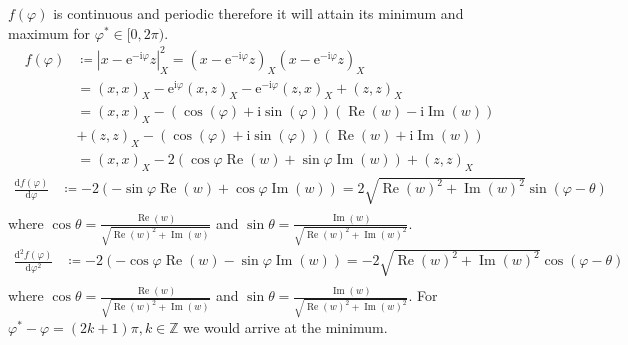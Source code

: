 		\begin{Proof}
			$f(\varphi)$ is continuous and periodic therefore it will attain its minimum and maximum for $\varphi^\ast \in [0,2\pi)$\cite{Rudin1976}\cite{Rudin1987}.
			\begin{equation*}
				\begin{split}
				f(\varphi) &\coloneqq \left|x-\mathrm{e}^{-\mathrm{i}\varphi}z\right|^2_X = 
				\left(x-\mathrm{e}^{-\mathrm{i}\varphi}z\right)_X\left(x-\mathrm{e}^{-\mathrm{i}\varphi}z\right)_X\\
						   &= \left(x,x\right)_X - \mathrm{e}^{\mathrm{i}\varphi}\left(x,z\right)_X-\mathrm{e}^{-\mathrm{i}\varphi}\left(z,x\right)_X+\left(z,z\right)_X \\
                		   &= \left(x,x\right)_X - (\cos(\varphi)+\mathrm{i}\sin(\varphi))\left(\operatorname{Re}(w) -\mathrm{i}\operatorname{Im}(w)\right)\\
						   &+ \left(z,z\right)_X - (\cos(\varphi)+\mathrm{i}\sin(\varphi))\left(\operatorname{Re}(w) +\mathrm{i}\operatorname{Im}(w)\right)\\
						   &= \left(x,x\right)_X - 2\left(\cos\varphi\operatorname{Re}(w)+\sin\varphi\operatorname{Im}(w)\right)+ \left(z,z\right)_X
				\end{split}
			  \end{equation*}
			  \begin{equation*}
				\begin{split}
				\frac{\mathrm{d}f(\varphi)}{\mathrm{d}\varphi} &\coloneqq - 2\left(-\sin\varphi\operatorname{Re}(w)+\cos\varphi\operatorname{Im}(w)\right) = 2\sqrt{\operatorname{Re}(w)^2+\operatorname{Im}(w)^2}\sin(\varphi-\theta)\\ 
				\end{split}
			  \end{equation*}
			  where $\cos\theta = \frac{\operatorname{Re}(w)}{\sqrt{\operatorname{Re}(w)^2+\operatorname{Im}(w)}}$ and $\sin\theta = \frac{\operatorname{Im}(w)}{\sqrt{\operatorname{Re}(w)^2+\operatorname{Im}(w)^2}}$.
			  \begin{equation*}
				\begin{split}
				\frac{\mathrm{d}^2f(\varphi)}{\mathrm{d}\varphi^2} &\coloneqq - 2\left(-\cos\varphi\operatorname{Re}(w)-\sin\varphi\operatorname{Im}(w)\right) = -2\sqrt{\operatorname{Re}(w)^2+\operatorname{Im}(w)^2}\cos(\varphi-\theta)\\ 
				\end{split}
			  \end{equation*}
			  where $\cos\theta = \frac{\operatorname{Re}(w)}{\sqrt{\operatorname{Re}(w)^2+\operatorname{Im}(w)}}$ and $\sin\theta = \frac{\operatorname{Im}(w)}{\sqrt{\operatorname{Re}(w)^2+\operatorname{Im}(w)^2}}$. 
			  For $\varphi^\ast-\varphi = (2k+1)\pi, k \in \mathbb{Z}$ we would arrive at the minimum.

		\end{Proof}

